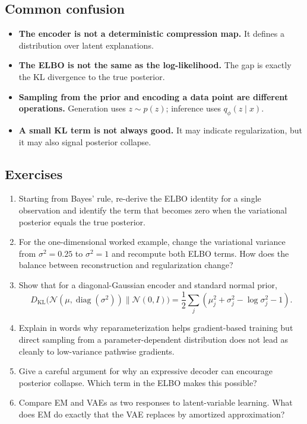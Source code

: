 \subsection*{Common confusion}

\begin{itemize}
    \item \textbf{The encoder is not a deterministic compression map.} It defines a distribution over latent explanations.
    \item \textbf{The ELBO is not the same as the log-likelihood.} The gap is exactly the KL divergence to the true posterior.
    \item \textbf{Sampling from the prior and encoding a data point are different operations.} Generation uses $z\sim p(z)$; inference uses $q_\phi(z\mid x)$.
    \item \textbf{A small KL term is not always good.} It may indicate regularization, but it may also signal posterior collapse.
\end{itemize}

\subsection*{Exercises}

\begin{enumerate}
    \item Starting from Bayes' rule, re-derive the ELBO identity for a single observation and identify the term that becomes zero when the variational posterior equals the true posterior.
    \item For the one-dimensional worked example, change the variational variance from $\sigma^2=0.25$ to $\sigma^2=1$ and recompute both ELBO terms. How does the balance between reconstruction and regularization change?
    \item Show that for a diagonal-Gaussian encoder and standard normal prior,
    \[
    D_{\mathrm{KL}}\bigl(\mathcal N(\mu,\operatorname{diag}(\sigma^2))\|\mathcal N(0,I)\bigr)
    =
    \frac12\sum_j(\mu_j^2+\sigma_j^2-\log \sigma_j^2-1).
    \]
    \item Explain in words why reparameterization helps gradient-based training but direct sampling from a parameter-dependent distribution does not lead as cleanly to low-variance pathwise gradients.
    \item Give a careful argument for why an expressive decoder can encourage posterior collapse. Which term in the ELBO makes this possible?
    \item Compare EM and VAEs as two responses to latent-variable learning. What does EM do exactly that the VAE replaces by amortized approximation?
\end{enumerate}

